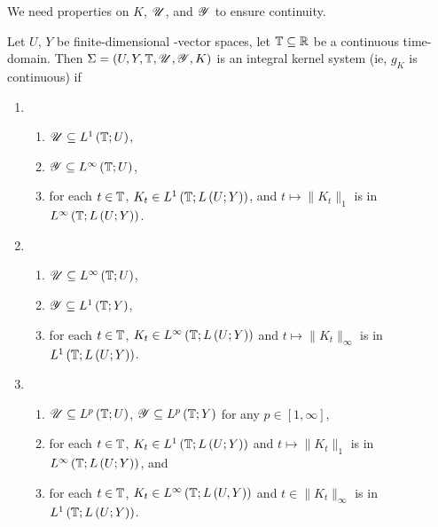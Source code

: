 We need properties on $K$, $\mathscr{U}$, and $\mathscr{Y}$ to ensure continuity. 
\begin{theorem}
	Let $U$, $Y$ be finite-dimensional \real-vector spaces, let $\mathbb{T} \subseteq \mathbb{R}$ be a continuous time-domain. Then $\Sigma = \left( U, Y, \mathbb{T} , \mathscr{U}, \mathscr{Y}, K \right) $ is an integral kernel system (ie, $g_K $ is continuous) if 
	\begin{enumerate}
		\item
			\begin{enumerate}
				\item $\mathscr{U} \subseteq L^{1}\left( \mathbb{T} ; U \right) $, 
				\item $\mathscr{Y} \subseteq L^{\infty}\left( \mathbb{T} ; U \right) $, 
				\item for each $t \in  \mathbb{T} $, $K_t \in L^{1}\left( \mathbb{T} ; L\left( U; Y \right)  \right) $, and $t \longmapsto \|K_t\|_1$ is in $L^{\infty}\left( \mathbb{T} ; L\left( U; Y \right) \right) $.
			\end{enumerate}
		\item 
			\begin{enumerate}
				\item $\mathscr{U} \subseteq L^{\infty}\left( \mathbb{T} ; U \right) $, 
				\item $\mathscr{Y}\subseteq L^{1}\left( \mathbb{T} ; Y \right) $, 
				\item for each $t \in  \mathbb{T} $, $K_t \in  L^{\infty}\left( \mathbb{T} ; L\left( U; Y \right)  \right) $ and $t \longmapsto \|K_t \|_\infty$ is in $L^{1}\left( \mathbb{T} ; L\left( U; Y \right)  \right) $. 
			\end{enumerate}
		\item 
			\begin{enumerate}
				\item $\mathscr{U} \subseteq L^{p}\left( \mathbb{T} ; U \right) $, $\mathscr{Y}\subseteq L^{p}\left( \mathbb{T} ; Y \right) $ for any $p \in \left[ 1, \infty \right] $, 
				\item for each $t \in  \mathbb{T} $, $K_t \in  L^{1}\left( \mathbb{T} ; L\left( U; Y \right)  \right) $ and $t \longmapsto \| K_t\|_1$ is in $L^{\infty}\left( \mathbb{T} ; L\left( U; Y \right)  \right) $, and 
				\item for each $t \in  \mathbb{T} $, $K_t \in  L^{\infty}\left( \mathbb{T} ; L\left( U, Y \right)  \right) $ and $t \in \| K_t\|_\infty$ is in $L^{1}\left( \mathbb{T} ; L\left( U; Y \right)  \right) $.
			\end{enumerate}
	\end{enumerate}
\end{theorem}


